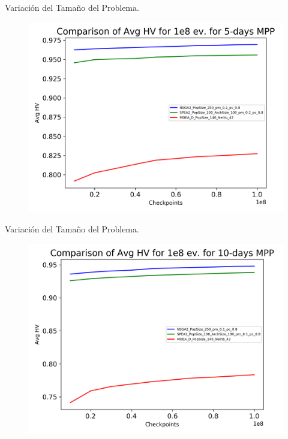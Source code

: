\documentclass[12pt]{beamer}
\begin{document}
\begin{frame}[fragile]{Variación del Tamaño del Problema.}
\begin{figure}
    \centering
    \includegraphics[width=1.0\linewidth]{images/avg_evolution_5_days.png}
\end{figure}
\end{frame}

\begin{frame}[fragile]{Variación del Tamaño del Problema.}
\begin{figure}
    \centering
    \includegraphics[width=1.0\linewidth]{images/avg_evolution_10_days.png}
\end{figure}
\end{frame}
\end{document}
